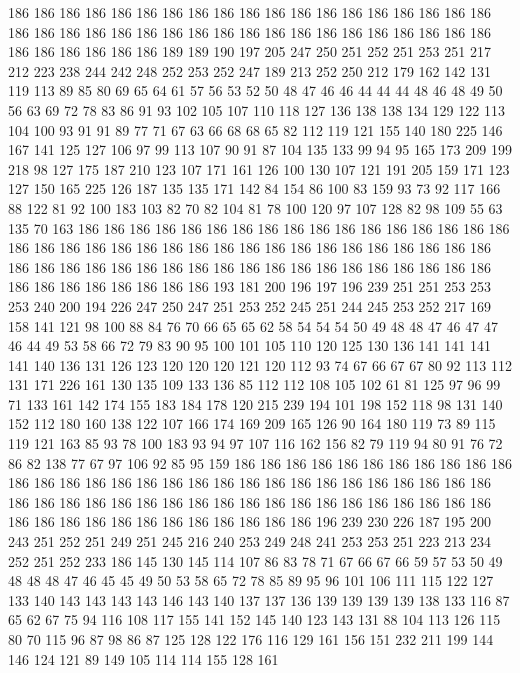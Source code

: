186 186 186 186 186 186 186 186 186 186 186 186 186 186 186 186 186 186 186 186
186 186 186 186 186 186 186 186 186 186 186 186 186 186 186 186 186 186 186 186
186 186 186 186 189 189 190 197 205 247 250 251 252 251 253 251 217 212 223 238
244 242 248 252 253 252 247 189 213 252 250 212 179 162 142 131 119 113 89 85
80 69 65 64 61 57 56 53 52 50 48 47 46 46 44 44 44 48 46 48
49 50 56 63 69 72 78 83 86 91 93 102 105 107 110 118 127 136 138 138
134 129 122 113 104 100 93 91 91 89 77 71 67 63 66 68 68 65 82 112
119 121 155 140 180 225 146 167 141 125 127 106 97 99 113 107 90 91 87 104
135 133 99 94 95 165 173 209 199 218 98 127 175 187 210 123 107 171 161 126
100 130 107 121 191 205 159 171 123 127 150 165 225 126 187 135 135 171 142 84
154 86 100 83 159 93 73 92 117 166 88 122 81 92 100 183 103 82 70 82
104 81 78 100 120 97 107 128 82 98 109 55 63 135 70 163 186 186 186 186
186 186 186 186 186 186 186 186 186 186 186 186 186 186 186 186 186 186 186 186
186 186 186 186 186 186 186 186 186 186 186 186 186 186 186 186 186 186 186 186
186 186 186 186 186 186 186 186 186 186 186 186 186 186 186 186 186 186 186 193
181 200 196 197 196 239 251 251 253 253 253 240 200 194 226 247 250 247 251 253
252 245 251 244 245 253 252 217 169 158 141 121 98 100 88 84 76 70 66 65
65 62 58 54 54 54 50 49 48 48 47 46 47 47 46 44 49 53 58 66
72 79 83 90 95 100 101 105 110 120 125 130 136 141 141 141 141 140 136 131
126 123 120 120 120 121 120 112 93 74 67 66 67 67 80 92 113 112 131 171
226 161 130 135 109 133 136 85 112 112 108 105 102 61 81 125 97 96 99 71
133 161 142 174 155 183 184 178 120 215 239 194 101 198 152 118 98 131 140 152
112 180 160 138 122 107 166 174 169 209 165 126 90 164 180 119 73 89 115 119
121 163 85 93 78 100 183 93 94 97 107 116 162 156 82 79 119 94 80 91
76 72 86 82 138 77 67 97 106 92 85 95 159 186 186 186 186 186 186 186
186 186 186 186 186 186 186 186 186 186 186 186 186 186 186 186 186 186 186 186
186 186 186 186 186 186 186 186 186 186 186 186 186 186 186 186 186 186 186 186
186 186 186 186 186 186 186 186 186 186 186 186 186 186 196 239 230 226 187 195
200 243 251 252 251 249 251 245 216 240 253 249 248 241 253 253 251 223 213 234
252 251 252 233 186 145 130 145 114 107 86 83 78 71 67 66 67 66 59 57
53 50 49 48 48 48 47 46 45 45 49 50 53 58 65 72 78 85 89 95
96 101 106 111 115 122 127 133 140 143 143 143 143 146 143 140 137 137 136 139
139 139 139 138 133 116 87 65 62 67 75 94 116 108 117 155 141 152 145 140
123 143 131 88 104 113 126 115 80 70 115 96 87 98 86 87 125 128 122 176
116 129 161 156 151 232 211 199 144 146 124 121 89 149 105 114 114 155 128 161
